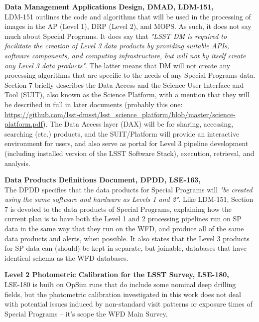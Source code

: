 \documentclass[DM,lsstdraft,toc]{lsstdoc}
\begin{document}
\noindent \textbf{Data Management Applications Design, DMAD, LDM-151, \cite{LDM-151}}\\
LDM-151 outlines the code and algorithms that will be used in the processing of images in the AP (Level 1), DRP (Level 2), and MOPS. As such, it does not say much about Special Programs. It does say that {\it "LSST DM is required to facilitate the creation of Level 3 data products by providing suitable APIs, software components, and computing infrastructure, but will not by itself create any Level 3 data products"}. The latter means that DM will not create any processing algorithms that are specific to the needs of any Special Programs data. Section 7 briefly describes the Data Access and the Science User Interface and Tool (SUIT), also known as the Science Platform, with a mention that they will be described in full in later documents  (probably this one: \url{https://github.com/lsst-dmsst/lsst_science_platform/blob/master/science-platform.pdf}). The Data Access layer (DAX) will be for sharing, accessing, searching (etc.) products, and the SUIT/Platform will provide an interactive environment for users, and also serve as portal for Level 3 pipeline development (including installed version of the LSST Software Stack), execution, retrieval, and analysis.

\noindent \textbf{Data Products Definitions Document, DPDD, LSE-163, \cite{LSE-163}}\\
The DPDD specifies that the data products for Special Programs will {\it "be created using the same software and hardware as Levels 1 and 2"}. Like LDM-151, Section 7 is devoted to the data products of Special Programs, explaining how the current plan is to have both the Level 1 and 2 processing pipelines run on SP data in the same way that they run on the WFD, and produce all of the same data products and alerts, when possible. It also states that the Level 3 products for SP data can (should) be kept in separate, but joinable, databases that have identical schema as the WFD databases.

\noindent \textbf{Level 2 Photometric Calibration for the LSST Survey, LSE-180, \cite{LSE-180}}\\
LSE-180 is built on OpSim runs that do include some nominal deep drilling fields, but the photometric calibration investigated in this work does not deal with potential issues induced by non-standard visit patterns or exposure times of Special Programs -- it's scope the WFD Main Survey. 
\end{document}
